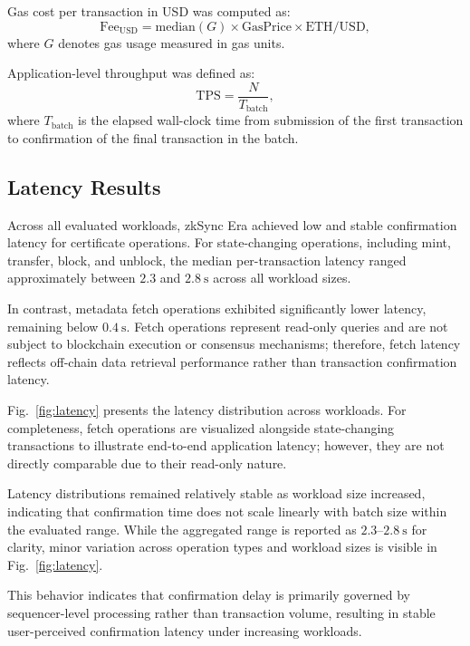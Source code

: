 \documentclass[pdflatex,sn-mathphys-num]{sn-jnl}
\begin{document}
Gas cost per transaction in USD was computed as:
\begin{equation}
\mathrm{Fee}_{\mathrm{USD}} = \mathrm{median}(G) \times \mathrm{GasPrice} \times \mathrm{ETH/USD},
\end{equation}
where $G$ denotes gas usage measured in gas units.

Application-level throughput was defined as:
\begin{equation}
\mathrm{TPS} = \frac{N}{T_{\mathrm{batch}}},
\end{equation}
where $T_{\mathrm{batch}}$ is the elapsed wall-clock time from submission of the first transaction to confirmation of the final transaction in the batch.

\subsection{Latency Results}

Across all evaluated workloads, zkSync Era achieved low and stable confirmation latency for certificate operations. For state-changing operations, including mint, transfer, block, and unblock, the median per-transaction latency ranged approximately between $2.3$ and $2.8~\mathrm{s}$ across all workload sizes.

In contrast, metadata fetch operations exhibited significantly lower latency, remaining below $0.4~\mathrm{s}$. Fetch operations represent read-only queries and are not subject to blockchain execution or consensus mechanisms; therefore, fetch latency reflects off-chain data retrieval performance rather than transaction confirmation latency.

Fig.~\ref{fig:latency} presents the latency distribution across workloads. For completeness, fetch operations are visualized alongside state-changing transactions to illustrate end-to-end application latency; however, they are not directly comparable due to their read-only nature.

Latency distributions remained relatively stable as workload size increased, indicating that confirmation time does not scale linearly with batch size within the evaluated range. While the aggregated range is reported as $2.3$--$2.8~\mathrm{s}$ for clarity, minor variation across operation types and workload sizes is visible in Fig.~\ref{fig:latency}.

This behavior indicates that confirmation delay is primarily governed by sequencer-level processing rather than transaction volume, resulting in stable user-perceived confirmation latency under increasing workloads.
\end{document}
